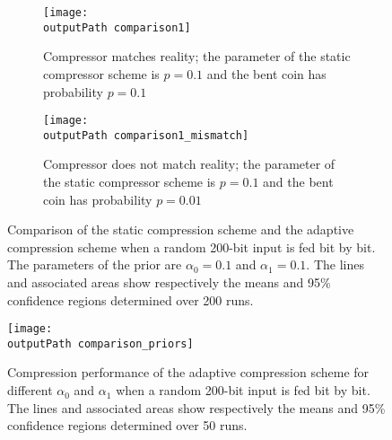 \documentclass[letterpaper,11pt]{extarticle}
\newcommand{\outputPath}{output/}
\begin{document}
\begin{figure}[ht]
    \centering
    \begin{subfigure}{.49\linewidth}
        \texttt{[image: \\outputPath comparison1]}
        \caption{Compressor matches reality; the parameter of the static compressor scheme is $p=0.1$ and the bent coin has probability $p=0.1$}
    \end{subfigure}
    \begin{subfigure}{.49\linewidth}
        \texttt{[image: \\outputPath comparison1\_mismatch]}
        \caption{Compressor does not match reality; the parameter of the static compressor scheme is $p=0.1$ and the bent coin has probability $p=0.01$}
    \end{subfigure}
    \caption{Comparison of the static compression scheme and the adaptive compression scheme when a random 200-bit input is fed bit by bit. The parameters of the prior are $\alpha_0=0.1$ and $\alpha_1=0.1$. The lines and associated areas show respectively the means and 95\% confidence regions determined over 200 runs.}
    \label{fig:comparison_mismatch}
\end{figure}


\begin{figure}[ht]
    \centering
    \texttt{[image: \\outputPath comparison\_priors]}
    \caption{Compression performance of the adaptive compression scheme for different $\alpha_0$ and $\alpha_1$ when a random 200-bit input is fed bit by bit. The lines and associated areas show respectively the means and 95\% confidence regions determined over 50 runs.}
    \label{fig:comparison_priors}
\end{figure}

\endgroup
\printbibliography
\end{document}
